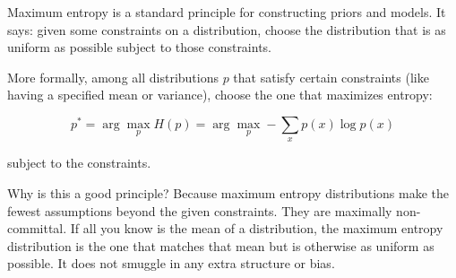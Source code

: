 Maximum entropy is a standard principle for constructing priors and models. It says: given some constraints on a distribution, choose the distribution that is as uniform as possible subject to those constraints.

More formally, among all distributions $p$ that satisfy certain constraints (like having a specified mean or variance), choose the one that maximizes entropy:

\begin{equation}
p^* = \arg\max_{p} H(p) = \arg\max_p -\sum_x p(x) \log p(x)
\end{equation}

subject to the constraints.

\vspace{1em}

Why is this a good principle? Because maximum entropy distributions make the fewest assumptions beyond the given constraints. They are maximally non-committal. If all you know is the mean of a distribution, the maximum entropy distribution is the one that matches that mean but is otherwise as uniform as possible. It does not smuggle in any extra structure or bias.

\vspace{1.5em}

